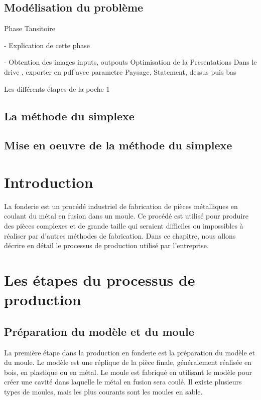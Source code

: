 \documentclass[12pt]{article}
\begin{document}
\subsection{Modélisation du problème}



Phase Tansitoire 

- Explication de cette phase 


- Obtention des images inputs, outpouts Optimisation de la Presentations
Dans le drive , exporter en pdf avec parametre Paysage, Statement, dessus puis bas


Les différents étapes  de la poche 1








\subsection{La méthode du simplexe}

\subsection{Mise en oeuvre de la méthode du simplexe}











\section{Introduction}
La fonderie est un procédé industriel de fabrication de pièces métalliques en coulant du métal en fusion dans un moule. Ce procédé est utilisé pour produire des pièces complexes et de grande taille qui seraient difficiles ou impossibles à réaliser par d'autres méthodes de fabrication. Dans ce chapitre, nous allons décrire en détail le processus de production utilisé par l'entreprise.

\section{Les étapes du processus de production}

\subsection{Préparation du modèle et du moule}
La première étape dans la production en fonderie est la préparation du modèle et du moule. Le modèle est une réplique de la pièce finale, généralement réalisée en bois, en plastique ou en métal. Le moule est fabriqué en utilisant le modèle pour créer une cavité dans laquelle le métal en fusion sera coulé. Il existe plusieurs types de moules, mais les plus courants sont les moules en sable.
\end{document}
